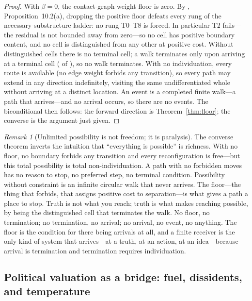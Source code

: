 \documentclass[twocolumn,11pt,a4paper]{article}
\theoremstyle{adv}
\theoremstyle{definition}
\theoremstyle{remark}
\newtheorem{remark}[theorem]{Remark}
\newcommand{\floor}{\beta}            %
\begin{document}
\begin{proof}
With $\floor=0$, the contact-graph weight floor is zero. By
\citet{sachikonye2025contact}, Proposition~10.2(a), dropping the positive
floor defeats every rung of the necessary-substructure ladder: no rung T0--T8
is forced. In particular T2 fails---the residual is not bounded away from
zero---so no cell has positive boundary content, and no cell is distinguished
from any other at positive cost. Without distinguished cells there is no
terminal cell; a walk terminates only upon arriving at a terminal cell
( of \citealt{sachikonye2025contact}), so no walk
terminates. With no individuation, every route is available (no edge weight
forbids any transition), so every path may extend in any direction
indefinitely, visiting the same undifferentiated whole without arriving at a
distinct location. An event is a completed finite walk---a path that
arrives---and no arrival occurs, so there are no events. The biconditional
then follows: the forward direction is Theorem~\ref{thm:floor}; the converse
is the argument just given.
\end{proof}

\begin{remark}[Unlimited possibility is not freedom; it is paralysis]
The converse theorem inverts the intuition that ``everything is possible'' is
richness. With no floor, no boundary forbids any transition and every
reconfiguration is free---but this total possibility is total
non-individuation. A path with no forbidden moves has no reason to stop, no
preferred step, no terminal condition. Possibility without constraint is an
infinite circular walk that never arrives. The floor---the thing that forbids,
that assigns positive cost to separation---is what gives a path a place to
stop. Truth is not what you reach; truth is what makes reaching possible, by
being the distinguished cell that terminates the walk. No floor, no
termination; no termination, no arrival; no arrival, no event, no anything.
The floor is the condition for there being arrivals at all, and a finite
receiver is the only kind of system that arrives---at a truth, at an action,
at an idea---because arrival is termination and termination requires
individuation.
\end{remark}

\subsection{Political valuation as a bridge: fuel, dissidents, and temperature}
\end{document}
